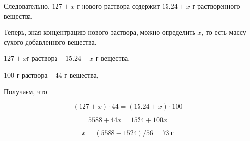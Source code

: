 Следовательно, $127+x$ г нового раствора содержит $15.24+x$ г растворенного вещества.

Теперь, зная концентрацию нового раствора, можно определить $x$, то есть массу сухого добавленного вещества.

$127+x $г раствора – $15.24+x$ г вещества,

100 г раствора – 44 г вещества,

Получаем, что

$$(127+x)\cdot44 = (15.24+x)\cdot100$$

$$5588+44x=1524+100x$$

$$x=(5588-1524)/56 = 73 \: \text{г}$$


